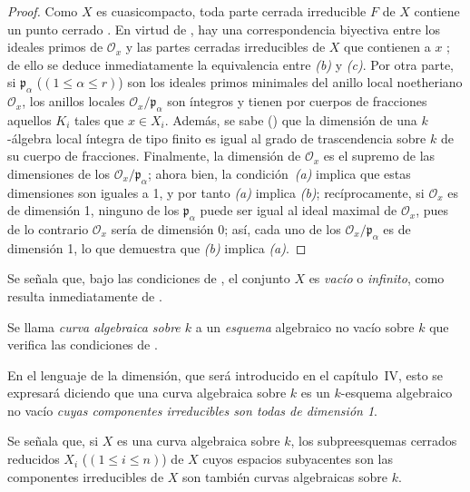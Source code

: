 \documentclass[oneside,10pt]{amsart}
\renewcommand{\leq}{\leqslant}
\let\EGAOriginalLabel\label
\renewcommand{\label}[1]{\phantomsection\EGAOriginalLabel{#1}}
\begin{document}
\begin{proof}
Como $X$ es cuasicompacto, toda parte cerrada irreducible $F$ de $X$ contiene un punto cerrado .
En virtud de , hay una correspondencia biyectiva entre los ideales primos de $\mathcal{O}_x$ y las partes cerradas irreducibles de $X$ que contienen a $x$ ;
de ello se deduce inmediatamente la equivalencia entre \emph{(b)} y \emph{(c)}.
Por otra parte, si $\mathfrak{p}_\alpha$ ($(1\leq\alpha\leq r)$) son los ideales primos minimales del anillo local noetheriano $\mathcal{O}_x$, los anillos locales $\mathcal{O}_x/\mathfrak{p}_\alpha$ son íntegros y tienen por cuerpos de fracciones aquellos $K_i$ tales que $x\in X_i$.
Además, se sabe (\cite[p.~4-06, th.~2]{I-1}) que la dimensión de una $k$-álgebra local íntegra de tipo finito es igual al grado de trascendencia sobre $k$ de su cuerpo de fracciones.
Finalmente, la dimensión de $\mathcal{O}_x$ es el supremo de las dimensiones de los $\mathcal{O}_x/\mathfrak{p}_\alpha$;
ahora bien, la condición~\emph{(a)} implica que estas dimensiones son iguales a 1, y por tanto \emph{(a)} implica \emph{(b)};
recíprocamente, si $\mathcal{O}_x$ es de dimensión 1, ninguno de los $\mathfrak{p}_\alpha$ puede ser igual al ideal maximal de $\mathcal{O}_x$, pues de lo contrario $\mathcal{O}_x$ sería de dimensión 0;
así, cada uno de los $\mathcal{O}_x/\mathfrak{p}_\alpha$ es de dimensión 1, lo que demuestra que \emph{(b)} implica \emph{(a)}.
\end{proof}

Se señala que, bajo las condiciones de , el conjunto $X$ es \emph{vacío} o \emph{infinito}, como resulta inmediatamente de .

\begin{definition}[7.4.2]
\label{II.7.4.2-fr}
Se llama \emph{curva algebraica sobre $k$} a un \emph{esquema} algebraico no vacío sobre $k$ que verifica las condiciones de \textup{}.
\end{definition}

En el lenguaje de la dimensión, que será introducido en el capítulo~IV, esto se expresará diciendo que una curva algebraica sobre $k$ es un $k$-esquema algebraico no vacío \emph{cuyas componentes irreducibles son todas de dimensión 1}.

Se señala que, si $X$ es una curva algebraica sobre $k$, los subpreesquemas cerrados reducidos $X_i$ ($(1\leq i\leq n)$) de $X$ cuyos espacios subyacentes son las componentes irreducibles de $X$ son también curvas algebraicas sobre $k$.
\end{document}
